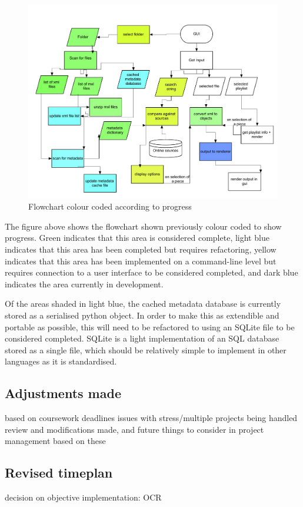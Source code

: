 \begin{figure}[h]
    \centering
    \includegraphics[width=400pt]{flowchart-progress}
    \caption{Flowchart colour coded according to progress}
\end{figure}
The figure above shows the flowchart shown previously colour coded to show progress. Green indicates that this area is considered complete, light blue indicates that this area has been completed but requires refactoring, yellow indicates that this area has been implemented on a command-line level but requires connection to a user interface to be considered completed, and dark blue indicates the area currently in development.

Of the areas shaded in light blue, the cached metadata database is currently stored as a serialised python object. In order to make this as extendible and portable as possible, this will need to be refactored to using an SQLite file to be considered completed. SQLite is a light implementation of an SQL database stored as a single file, which should be relatively simple to implement in other languages as it is standardised.
\subsection{Adjustments made}
based on coursework deadlines
issues with stress/multiple projects being handled
review and modifications made, and future things to consider in project management based on these

\subsection{Revised timeplan}
decision on objective implementation: OCR